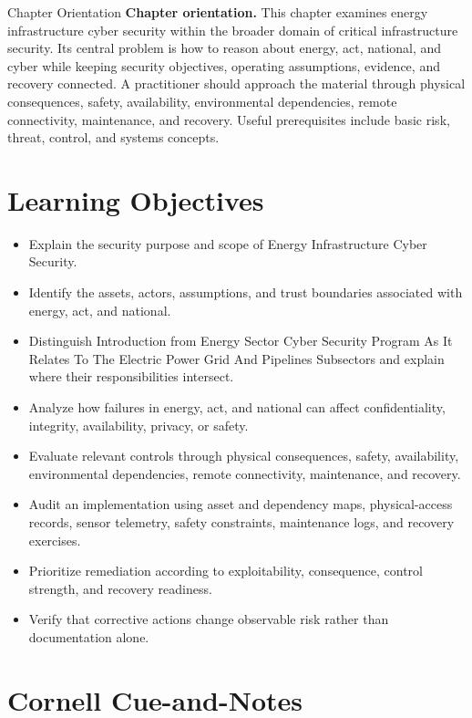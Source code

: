 \documentclass[11pt,letterpaper]{article}
\title{\CornellDocumentTitle}
\author{}
\date{}
\begin{document}
\maketitle
\begin{CornellOverviewBox}{Chapter Orientation}
\textbf{Chapter orientation.} This chapter examines energy infrastructure cyber security within the broader domain of critical infrastructure security. Its central problem is how to reason about energy, act, national, and cyber while keeping security objectives, operating assumptions, evidence, and recovery connected. A practitioner should approach the material through physical consequences, safety, availability, environmental dependencies, remote connectivity, maintenance, and recovery. Useful prerequisites include basic risk, threat, control, and systems concepts.
\end{CornellOverviewBox}
\section*{Learning Objectives}
\begin{itemize}
\item Explain the security purpose and scope of Energy Infrastructure Cyber Security.
\item Identify the assets, actors, assumptions, and trust boundaries associated with energy, act, and national.
\item Distinguish Introduction from Energy Sector Cyber Security Program As It Relates To The Electric Power Grid And Pipelines Subsectors and explain where their responsibilities intersect.
\item Analyze how failures in energy, act, and national can affect confidentiality, integrity, availability, privacy, or safety.
\item Evaluate relevant controls through physical consequences, safety, availability, environmental dependencies, remote connectivity, maintenance, and recovery.
\item Audit an implementation using asset and dependency maps, physical-access records, sensor telemetry, safety constraints, maintenance logs, and recovery exercises.
\item Prioritize remediation according to exploitability, consequence, control strength, and recovery readiness.
\item Verify that corrective actions change observable risk rather than documentation alone.
\end{itemize}
\section*{Cornell Cue-and-Notes}
\end{document}
